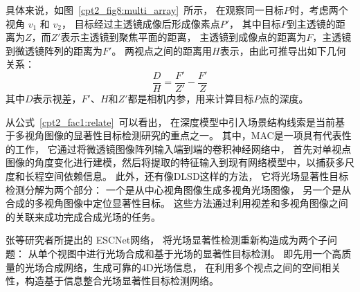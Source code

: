 具体来说，如图~\ref{cpt2_fig8:multi_array}~所示，
在观察同一目标$P$时，考虑两个视角 $v_{1}$ 和 $v_{2}$，
目标经过主透镜成像后形成像素点$P'$，
其中目标$P$到主透镜的距离为$Z$，而$Z'$表示主透镜到聚焦平面的距离，
主透镜到成像点的距离为$F$，主透镜到微透镜阵列的距离为$F'$。
两视点之间的距离用$H$表示，由此可推导出如下几何关系：
%
%
\begin{equation}
	\frac{D}{H} = \frac{F'}{Z'} - \frac{F'}{Z} 
	\label{cpt2_fac1:relate}
\end{equation}
%
%
其中$D$表示视差，$F'$、$H$和$Z'$都是相机内参，用来计算目标$P$点的深度。\par
%
%

%
%
%
%
从公式~\ref{cpt2_fac1:relate}~可以看出，
在深度模型中引入场景结构线索是当前基于多视角图像的显著性目标检测研究的重点之一。
其中，MAC是一项具有代表性的工作，
它通过将微透镜图像阵列输入端到端的卷积神经网络中，
首先对单视点图像的角度变化进行建模，然后将提取的特征输入到现有网络模型中，以捕获多尺度和长程空间依赖信息。
%
%
%
此外，还有像DLSD这样的方法，
它将光场显著性目标检测分解为两个部分：
一个是从中心视角图像生成多视角光场图像，
另一个是从合成的多视角图像中定位显著性目标。
这些方法通过利用视差和多视角图像之间的关联来成功完成合成光场的任务。
%
%
%
%
%
%
%




张等研究者所提出的 ESCNet网络，
将光场显著性检测重新构造成为两个子问题：
从单个视图中进行光场合成和基于光场的显著性目标检测。
即先用一个高质量的光场合成网络，生成可靠的4D光场信息，
在利用多个视点之间的空间相关性，构造基于信息整合光场显著性目标检测网络。

















